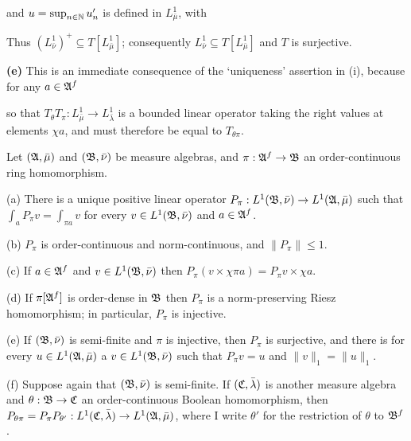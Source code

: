 {
     
\noindent and $u=\sup_{n\in\Bbb N}u'_n$ is defined in $L^1_{\bar\mu}$,
with
     
     
\noindent Thus $(L^1_{\bar\nu})^+\subseteq T[L^1_{\bar\mu}]$;
consequently $L^1_{\bar\nu}\subseteq T[L^1_{\bar\mu}]$ and $T$ is
surjective.
     
\medskip
     
{\bf (e)} This is an immediate consequence of the `uniqueness'
assertion in (i), because for any $a\in\frak A^f$
     
     
\noindent so that $T_{\theta}T_{\pi}:L^1_{\bar\mu}\to L^1_{\bar\lambda}$
is a bounded linear operator taking the right values at elements
$\chi a$, and must therefore be equal to $T_{\theta\pi}$.
}%
     
 Let $(\frak A,\bar\mu)$ and $(\frak B,\bar\nu)$
be measure algebras, and $\pi:\frak A^f\to\frak B$ an order-continuous
ring homomorphism.
     
(a) There is a unique positive linear operator
$P_{\pi}:L^1(\frak B,\bar\nu)\to L^1(\frak A,\bar\mu)$ such that
$\int_aP_{\pi}v=\int_{\pi a}v$ for every $v\in L^1(\frak B,\bar\nu)$ and
$a\in\frak A^f$.
     
(b) $P_{\pi}$ is order-continuous and norm-continuous, and
$\|P_{\pi}\|\le 1$.
     
(c) If $a\in\frak A^f$ and $v\in L^1(\frak B,\bar\nu)$ then
$P_{\pi}(v\times\chi\pi a)=P_{\pi}v\times\chi a$.
     
(d) If $\pi[\frak A^f]$ is order-dense in $\frak B$ then $P_{\pi}$ is a
norm-preserving
Riesz homomorphism;  in particular, $P_{\pi}$ is injective.
     
(e) If $(\frak B,\bar\nu)$ is semi-finite and $\pi$ is
injective, then $P_{\pi}$ is surjective, and there is for every
$u\in L^1(\frak A,\bar\mu)$ a $v\in L^1(\frak B,\bar\nu)$ such that
$P_{\pi}v=u$ and $\|v\|_1=\|u\|_1$.
     
(f) Suppose again that $(\frak B,\bar\nu)$ is semi-finite.   If
$(\frak C,\bar\lambda)$
is another measure algebra and $\theta:\frak B\to\frak C$ an
order-continuous Boolean homomorphism, then
$P_{\theta\pi}=P_{\pi}P_{\theta'}:
L^1(\frak C,\bar\lambda)\to L^1(\frak A,\bar\mu)$, where I write
$\theta'$ for the restriction of $\theta$ to $\frak B^f$.
     
